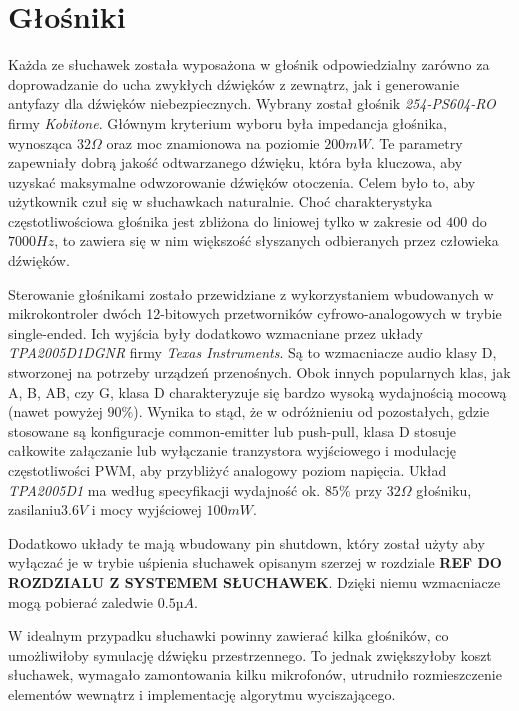 \section{Głośniki}
\label{cha:glosniki}

Każda ze słuchawek została wyposażona w głośnik odpowiedzialny zarówno za doprowadzanie do ucha zwykłych dźwięków z zewnątrz, jak i generowanie antyfazy dla dźwięków niebezpiecznych. Wybrany został głośnik \textit{254-PS604-RO} firmy \textit{Kobitone}. Głównym kryterium wyboru była impedancja głośnika, wynosząca $32\Omega$ oraz moc znamionowa na poziomie $ 200 mW $. Te parametry zapewniały dobrą jakość odtwarzanego dźwięku, która była kluczowa, aby uzyskać maksymalne odwzorowanie dźwięków otoczenia. Celem było to, aby użytkownik czuł się w słuchawkach naturalnie. Choć charakterystyka częstotliwościowa głośnika jest zbliżona do liniowej tylko w zakresie od $ 400 $ do $ 7000 Hz $, to zawiera się w nim większość słyszanych odbieranych przez człowieka dźwięków.

Sterowanie głośnikami zostało przewidziane z wykorzystaniem wbudowanych w mikrokontroler dwóch 12-bitowych przetworników cyfrowo-analogowych w trybie single-ended. Ich wyjścia były dodatkowo wzmacniane przez układy \textit{TPA2005D1DGNR} firmy \textit{Texas Instruments}. Są to wzmacniacze audio klasy D, stworzonej na potrzeby urządzeń przenośnych. Obok innych popularnych klas, jak A, B, AB, czy G, klasa D charakteryzuje się bardzo wysoką wydajnością mocową (nawet powyżej $ 90\% $). Wynika to stąd, że w odróżnieniu od pozostałych, gdzie stosowane są konfiguracje common-emitter lub push-pull, klasa D stosuje całkowite załączanie lub wyłączanie tranzystora wyjściowego i modulację częstotliwości PWM, aby przybliżyć analogowy poziom napięcia\cite{AudioAmps}. Układ \textit{TPA2005D1} ma według specyfikacji wydajność ok. $ 85\% $ przy $32\Omega$ głośniku, zasilaniu$  3.6V $ i mocy wyjściowej $ 100mW $.

Dodatkowo układy te mają wbudowany pin shutdown, który został użyty aby wyłączać je w trybie uśpienia słuchawek opisanym szerzej w rozdziale \textbf{REF DO ROZDZIALU Z SYSTEMEM SŁUCHAWEK}. Dzięki niemu wzmacniacze mogą pobierać zaledwie $ 0.5 µA $.

W idealnym przypadku słuchawki powinny zawierać kilka głośników, co umożliwiłoby symulację dźwięku przestrzennego. To jednak zwiększyłoby koszt słuchawek, wymagało zamontowania kilku mikrofonów, utrudniło rozmieszczenie elementów wewnątrz i implementację algorytmu wyciszającego.